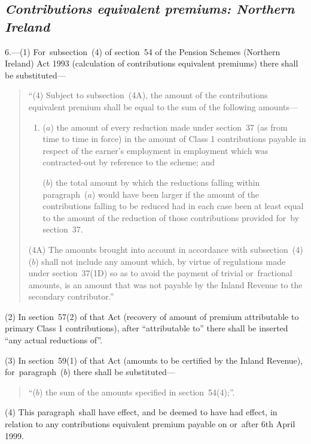 \documentclass[12pt,a4paper]{article}
\begin{document}

\subsection*{\itshape Contributions equivalent premiums: Northern Ireland}

6.---(1) For~subsection~(4)  of section~54 of the Pension Schemes (Northern Ireland) Act 1993 (calculation of contributions equivalent premiums) there shall be substituted—
\begin{quotation}
“(4) Subject to subsection~(4A), the amount of the contributions equivalent premium shall be equal to the sum of the following amounts—
\begin{enumerate}\item[]
($a$) the amount of every reduction made under section~37 (as from time to time in force) in the amount of Class 1 contributions payable in respect of the earner’s employment in employment which was contracted-out by reference to the scheme; and

($b$) the total amount by which the reductions falling within paragraph~($a$)  would have been larger if the amount of the contributions falling to be reduced had in each case been at least equal to the amount of the reduction of those contributions provided for~by section~37. 
\end{enumerate}

(4A) The amounts brought into account in accordance with subsection~(4)($b$)  shall not include any amount which, by virtue of regulations made under section~37(1D) so as to avoid the payment of trivial or~fractional amounts, is an amount that was not payable by the Inland Revenue to the secondary contributor.”
\end{quotation}

(2) In section~57(2)  of that Act (recovery of amount of premium attributable to primary Class 1 contributions), after “attributable to” there shall be inserted “any actual reductions of”.

(3) In section~59(1)  of that Act (amounts to be certified by the Inland Revenue), for~paragraph~($b$)  there shall be substituted—
\begin{quotation}
“($b$) the sum of the amounts specified in section~54(4);”.
\end{quotation}

(4) This paragraph~shall have effect, and be deemed to have had effect, in relation to any contributions equivalent premium payable on or~after 6th April 1999. 
\end{document}
